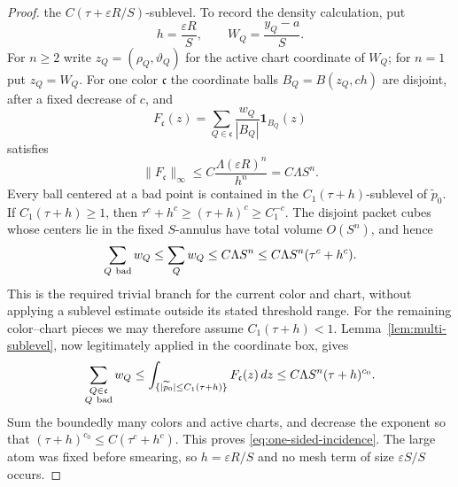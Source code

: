 \documentclass[11pt]{article}
\numberwithin{equation}{section}
\theoremstyle{remark}
\theoremstyle{definition}
\newcommand{\norm}[1]{\lVert #1\rVert}
\begin{document}
\begin{proof}
the $C(\tau+\varepsilon R/S)$-sublevel.  To record the density calculation, put
\[
 h=\frac{\varepsilon R}{S},\qquad W_Q=\frac{y_Q-a}{S}.
\]
For $n\ge2$ write $z_Q=(\rho_Q,\vartheta_Q)$ for the active chart
coordinate of $W_Q$; for $n=1$ put $z_Q=W_Q$.  For one color
$\mathfrak c$ the coordinate balls $B_Q=B(z_Q,ch)$ are disjoint, after a
fixed decrease of $c$, and
\[
 F_{\mathfrak c}(z)
 =\sum_{Q\in\mathfrak c}\frac{w_Q}{|B_Q|}\mathbf1_{B_Q}(z)
\]
satisfies
\begin{equation}\label{eq:one-sided-smeared-density}
 \norm{F_{\mathfrak c}}_\infty
 \le C\frac{\Lambda(\varepsilon R)^n}{h^n}
 =C\Lambda S^n.
\end{equation}
Every ball centered at a bad point is contained in the
$C_1(\tau+h)$-sublevel of $\widetilde p_0$.  If
$C_1(\tau+h)\ge1$, then
$\tau^c+h^c\ge(\tau+h)^c\ge C_1^{-c}$.  The disjoint packet cubes whose
centers lie in the fixed $S$-annulus have total volume $O(S^n)$, and hence
\[
 \sum_{Q\ {\rm bad}}w_Q\le\sum_Qw_Q\le C\Lambda S^n
 \le C\Lambda S^n(\tau^c+h^c).
\]
This is the required trivial branch for the current color and chart,
without applying a sublevel estimate outside its stated threshold range.
For the remaining color--chart pieces we may therefore assume
$C_1(\tau+h)<1$.  Lemma~\ref{lem:multi-sublevel}, now legitimately
applied in the coordinate box, gives
\[
 \sum_{\substack{Q\in\mathfrak c\\Q\ {\rm bad}}}w_Q
 \le\int_{\{|\widetilde p_0|\le C_1(\tau+h)\}}
       F_{\mathfrak c}(z)\,dz
 \le C\Lambda S^n(\tau+h)^{c_0}.
\]
Sum the boundedly many colors and active charts, and decrease the exponent
so that $(\tau+h)^{c_0}\le C(\tau^c+h^c)$.  This proves
\eqref{eq:one-sided-incidence}.  The large atom was fixed before
smearing, so $h=\varepsilon R/S$ and no mesh term of size
$\varepsilon S/S$ occurs.
\end{proof}
\end{document}
